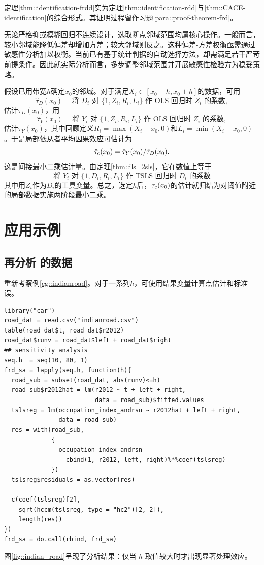  定理\ref{thm::identification-frdd}实为定理\ref{thm::identification-rdd}与\ref{thm::CACE-identification}的综合形式。其证明过程留作习题\ref{para::proof-theorem-frd}。 
 

无论严格抑或模糊回归不连续设计，选取断点邻域范围均属核心操作。一般而言，较小邻域能降低偏差却增加方差；较大邻域则反之。这种偏差-方差权衡亟需通过敏感性分析加以权衡。当前已有基于统计判据的自动选择方法，却需满足若干严苛前提条件。因此就实际分析而言，多步调整邻域范围并开展敏感性检验方为稳妥策略。 

假设已用带宽$h$确定$x_0$的邻域。对于满足$X_i \in [x_0-h, x_0 + h]$的数据，可用$$
\hat{\tau}_D(x_0) = \text{将 } D_i \text{ 对 } \{1, Z_i, R_i, L_i\} \text{ 作 OLS 回归时 } Z_i \text{ 的系数},
$$估计$\tau_D(x_0) $，用$$
\hat{\tau}_Y(x_0) = \text{将 } Y_i \text{ 对 } \{1, Z_i, R_i, L_i\} \text{ 作 OLS 回归时 } Z_i \text{ 的系数},
$$估计$\tau_Y(x_0) $，其中回顾定义$R_i = \max(X_i - x_0, 0)$和$L_i= \min (X_i - x_0, 0)$。于是局部依从者平均因果效应可估计为$$
\hat\tau_{\textup{c}}(x_0)  = \hat{\tau}_Y(x_0) / \hat{\tau}_D(x_0).
$$这是间接最小二乘估计量。由定理\ref{thm::ils=2sls}，它在数值上等于$$
\text{将 } Y_i \text{ 对 } \{1, D_i, R_i, L_i\} \text{ 作 TSLS 回归时 } D_i \text{ 的系数}
$$其中用$Z_i$作为$D_i$的工具变量。总之，选定$h$后，$ \tau_{\textup{c}}(x_0)$的估计就归结为对阈值附近的局部数据实施两阶段最小二乘。  


\section{应用示例}
 \label{sec::application-frdd}

\subsection{再分析 \citet{asher2020rural} 的数据}
\label{sec::indian-road-data}

重新考察例\ref{eg::indianroad}。对于一系列$h$，可使用结果变量计算点估计和标准误。 
\begin{lstlisting}
library("car")
road_dat = read.csv("indianroad.csv")
table(road_dat$t, road_dat$r2012)
road_dat$runv = road_dat$left + road_dat$right
## sensitivity analysis 
seq.h  = seq(10, 80, 1)
frd_sa = lapply(seq.h, function(h){
  road_sub = subset(road_dat, abs(runv)<=h)
  road_sub$r2012hat = lm(r2012 ~ t + left + right,
                         data = road_sub)$fitted.values
  tslsreg = lm(occupation_index_andrsn ~ r2012hat + left + right,
               data = road_sub)
  res = with(road_sub,
             {
               occupation_index_andrsn -
                 cbind(1, r2012, left, right)%*%coef(tslsreg)
             })
  tslsreg$residuals = as.vector(res)
  
  c(coef(tslsreg)[2],
    sqrt(hccm(tslsreg, type = "hc2")[2, 2]),
    length(res))
})
frd_sa = do.call(rbind, frd_sa)
\end{lstlisting}
图\ref{fig::indian_road}呈现了分析结果：仅当 $h$ 取值较大时才出现显著处理效应。 

